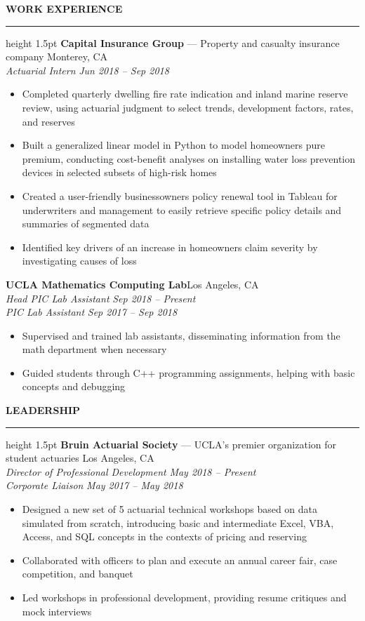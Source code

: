 \documentclass[11pt,letterpaper]{article}
\newcommand{\sectline}{\vspace{3pt}\hrule height 1.5pt\vspace{3pt}}
\newcommand{\sectspace}{\vspace{7pt}}
\newcommand{\smallspace}{\vspace{2pt}}
\begin{document}
\textbf{WORK EXPERIENCE}\sectline
\textbf{Capital Insurance Group} --- Property and casualty insurance company \hfill Monterey, CA \\
\textit{Actuarial Intern} \hfill \textit{Jun 2018 -- Sep 2018}
\begin{itemize}
	\item Completed quarterly dwelling fire rate indication and inland marine reserve review, using actuarial judgment to select trends, development factors, rates, and reserves
	\item Built a generalized linear model in Python to model homeowners pure premium, conducting cost-benefit analyses on installing water loss prevention devices in selected subsets of high-risk homes 
	\item Created a user-friendly businessowners policy renewal tool in Tableau for underwriters and management to easily retrieve specific policy details and summaries of segmented data
	\item Identified key drivers of an increase in homeowners claim severity by investigating causes of loss
\end{itemize}
\smallspace 
\textbf{UCLA Mathematics Computing Lab}\hfill Los Angeles, CA \\
\textit{Head PIC Lab Assistant} \hfill \textit{Sep 2018 -- Present} \\
\textit{PIC Lab Assistant} \hfill \textit{Sep 2017 -- Sep 2018}
\begin{itemize}
	\item Supervised and trained lab assistants, disseminating information from the math department when necessary
	\item Guided students through C++ programming assignments, helping with basic concepts and debugging
\end{itemize}
\sectspace


\textbf{LEADERSHIP} \sectline
\textbf{Bruin Actuarial Society} --- UCLA's premier organization for student actuaries \hfill Los Angeles, CA \\
\textit{Director of Professional Development} \hfill \textit{May 2018 -- Present} \\
\textit{Corporate Liaison} \hfill \textit{May 2017 -- May 2018}
\begin{itemize}
	\item Designed a new set of 5 actuarial technical workshops based on data simulated from scratch, introducing basic and intermediate Excel, VBA, Access, and SQL concepts in the contexts of pricing and reserving
	\item Collaborated with officers to plan and execute an annual career fair, case competition, and banquet
	\item Led workshops in professional development, providing resume critiques and mock interviews
\end{itemize}
\sectspace
\end{document}
